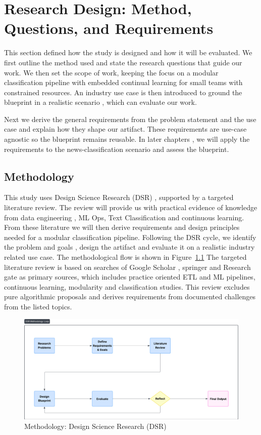\chapter{Research Design: Method, Questions, and Requirements}
This section defined how the study is designed and how it will be evaluated. We first outline the method used and state the research questions that guide our work. We then set the scope of work, keeping the focus on a modular classification pipeline with embedded continual learning for small teams with constrained resources. An industry use case is then introduced to ground the blueprint in a realistic scenario , which can evaluate our work.
\smallbreak


Next we derive the general requirements from the problem statement and the use case and explain how they shape our artifact. These requirements are use-case agnostic so the blueprint remains reusable. In later chapters , we will apply the requirements to the news-classification scenario and assess the blueprint.

\section{Methodology}
This study uses Design Science Research (DSR) , supported by a targeted literature review. The review will provide us with practical evidence of knowledge from data engineering , ML Ops, Text Classification and continuous learning. From these literature we will then derive requirements and design principles needed for a modular classification pipeline. Following the DSR cycle, we identify the problem and goals , design the artifact and evaluate it on a realistic industry related use case.
The methodological flow is shown in Figure~\ref{fig:dsr-loop}
The targeted literature review is based on searches of Google Scholar , springer and Research gate as primary sources, which includes practice oriented ETL and ML pipelines, continuous learning, modularity and classification studies. This review excludes pure algorithmic proposals and derives requirements from documented challenges from the listed topics.

\begin{figure}[htbp]
    \centering
    \includegraphics[width=\linewidth]{gfx/examples/dsr_loop.jpeg}
    \caption{Methodology: Design Science Research (DSR)}
    \label{fig:dsr-loop}
\end{figure}


